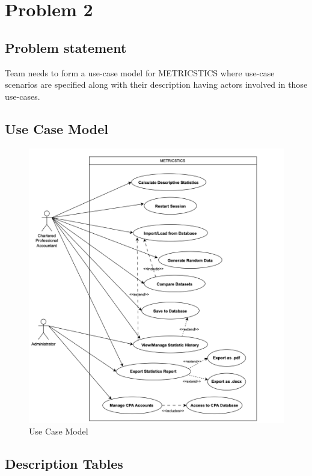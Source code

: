 \chapter{Problem 2}
\section{Problem statement}

Team needs to form a use-case model \cite{use-case-diagram} for METRICSTICS where use-case scenarios are specified along with their description having actors involved in those use-cases.

\section{Use Case Model} 
    \begin{figure}[H]
        \includegraphics[width=13.3cm]{images/use_case_model.png}
        \caption{Use Case Model}
    \end{figure}

\section{Description Tables}

